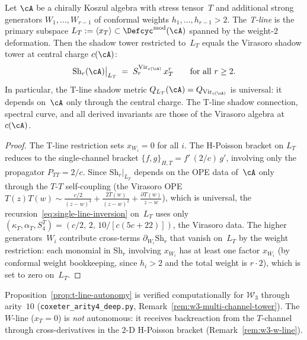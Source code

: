 \begin{proposition}
\label{prop:t-line-autonomy}
\ClaimStatusProvedHere
{}
Let $\cA$ be a chirally Koszul algebra with stress tensor~$T$
and additional strong generators $W_1, \dotsc, W_{r-1}$ of
conformal weights $h_1, \dotsc, h_{r-1} > 2$.  The
\emph{T-line} is the primary subspace $L_T := \langle x_T \rangle
\subset \Defcyc^{\mathrm{mod}}(\cA)$ spanned by the weight-$2$
deformation.  Then the shadow tower restricted to~$L_T$ equals
the Virasoro shadow tower at central charge $c(\cA)$:
\[
  \mathrm{Sh}_r(\cA)\big|_{L_T}
  \;=\;
  S_r^{\mathrm{Vir}_{c(\cA)}}\,x_T^r
  \qquad\text{for all $r \geq 2$.}
\]
In particular, the T-line shadow metric
$Q_{L_T}(\cA) = Q_{\mathrm{Vir}_{c(\cA)}}$ is
universal: it depends on~$\cA$ only through the central
charge.  The T-line shadow connection, spectral curve,
and all derived invariants are those of the Virasoro
algebra at~$c(\cA)$.
\end{proposition}

\begin{proof}
The T-line restriction sets $x_{W_i} = 0$ for all $i$.
The H-Poisson bracket on $L_T$ reduces to the single-channel
bracket $\{f, g\}_{H,T} = f'\,(2/c)\,g'$, involving only
the propagator $P_{TT} = 2/c$.
Since $\mathrm{Sh}_r|_{L_T}$ depends on the OPE data of~$\cA$
only through the $T$-$T$ self-coupling (the Virasoro OPE
$T(z)T(w) \sim \frac{c/2}{(z{-}w)^4} + \frac{2T(w)}{(z{-}w)^2}
+ \frac{\partial T(w)}{z{-}w}$), which is universal,
the recursion~\eqref{eq:single-line-inversion} on~$L_T$
uses only $(\kappa_T, \alpha_T, S_4^T) =
(c/2,\, 2,\, 10/[c(5c{+}22)])$, the Virasoro data.
The higher generators~$W_i$ contribute cross-terms
$\partial_{W_i}\mathrm{Sh}_r$ that vanish on~$L_T$
by the weight restriction: each monomial in $\mathrm{Sh}_r$
involving $x_{W_i}$ has at least one factor $x_{W_i}$
(by conformal weight bookkeeping, since $h_i > 2$ and the
total weight is $r \cdot 2$), which is set to zero on~$L_T$.
\end{proof}

\begin{remark}
Proposition~\ref{prop:t-line-autonomy} is verified computationally
for $\mathcal{W}_3$ through arity~$10$
(\texttt{coxeter\_arity4\_deep.py},
Remark~\ref{rem:w3-multi-channel-tower}).
The $W$-line ($x_T = 0$) is \emph{not} autonomous: it receives
backreaction from the $T$-channel through cross-derivatives in the
$2$-D H-Poisson bracket (Remark~\ref{rem:w3-w-line}).
\end{remark}

